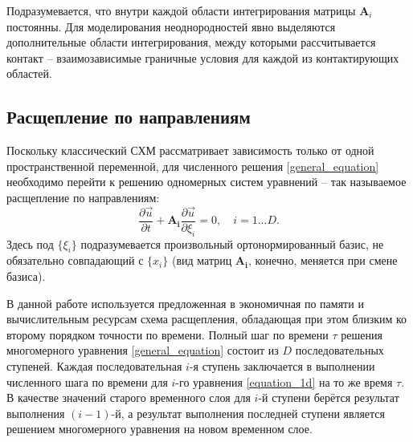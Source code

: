 \documentclass[a4paper]{article}
\numberwithin{equation}{section}
\begin{document}
Подразумевается, что внутри каждой области интегрирования матрицы $\mathbf{A}_i$
постоянны. Для моделирования неоднородностей явно выделяются дополнительные
области интегрирования, между которыми рассчитывается контакт -- взаимозависимые
граничные условия для каждой из контактирующих областей.


\subsection{Расщепление по направлениям}
Поскольку классический СХМ рассматривает зависимость только от одной пространственной переменной,
для численного решения \eqref{general_equation} необходимо
перейти к решению одномерных систем уравнений -- так называемое расщепление по направлениям:
\begin{equation}
\label{equation_1d}
	\frac{\partial\vec{u}}{\partial{t}}+\mathbf{A_i}\frac{\partial\vec{u}}{\partial{\xi_i}} = 0, \quad i = 1 ... D.
\end{equation}
Здесь под $\{\xi_i\}$ подразумевается произвольный ортонормированный базис, 
не обязательно совпадающий с $\{x_i\}$ 
(вид матриц $\mathbf{A_i}$, конечно, меняется при смене базиса).

В данной работе используется предложенная в \cite{chelnokov}
экономичная по памяти и вычислительным ресурсам схема расщепления, 
обладающая при этом близким ко второму порядком точности по времени.
Полный шаг по времени $\tau$ решения многомерного уравнения \eqref{general_equation} 
состоит из $D$ последовательных ступеней. 
Каждая последовательная $i$-я ступень заключается в выполнении численного шага по времени
для $i$-го уравнения \eqref{equation_1d} на то же время $\tau$. 
В качестве значений старого временного слоя для $i$-й ступени 
берётся результат выполнения $(i-1)$-й, 
а результат выполнения последней ступени является решением 
многомерного уравнения на новом временном слое. 
\end{document}
